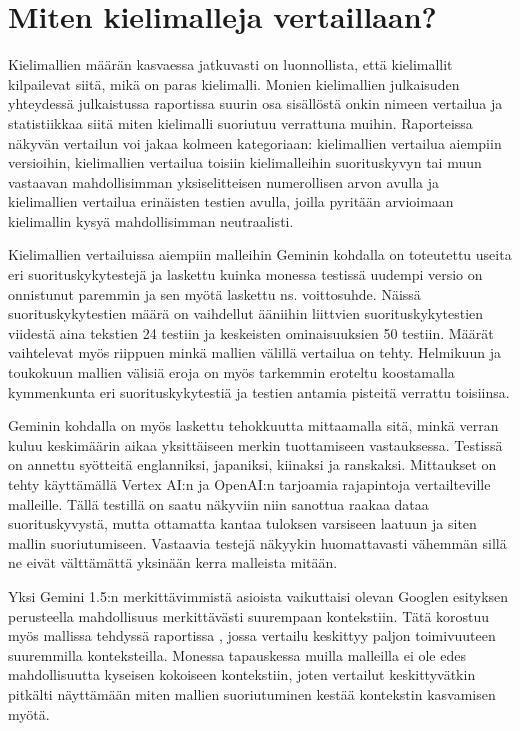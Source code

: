 \section{Miten kielimalleja vertaillaan?}

Kielimallien määrän kasvaessa jatkuvasti on luonnollista, että kielimallit
kilpailevat siitä, mikä on paras kielimalli. Monien kielimallien julkaisuden
yhteydessä julkaistussa raportissa suurin osa sisällöstä onkin nimeen vertailua
ja statistiikkaa siitä miten kielimalli suoriutuu verrattuna muihin.
Raporteissa näkyvän vertailun voi jakaa kolmeen kategoriaan: kielimallien
vertailua aiempiin versioihin, kielimallien vertailua toisiin kielimalleihin
suorituskyvyn tai muun vastaavan mahdollisimman yksiselitteisen numerollisen
arvon avulla ja kielimallien vertailua erinäisten testien avulla, joilla
pyritään arvioimaan kielimallin kysyä mahdollisimman neutraalisti.

Kielimallien vertailuissa aiempiin malleihin Geminin kohdalla on toteutettu
useita eri suorituskykytestejä ja laskettu kuinka monessa testissä uudempi
versio on onnistunut paremmin ja sen myötä laskettu ns. voittosuhde. Näissä
suorituskykytestien määrä on vaihdellut ääniihin liittvien suorituskykytestien
viidestä aina tekstien 24 testiin ja keskeisten ominaisuuksien 50 testiin.
Määrät vaihtelevat myös riippuen minkä mallien välillä vertailua on tehty.
Helmikuun ja toukokuun mallien välisiä eroja on myös tarkemmin eroteltu
koostamalla kymmenkunta eri suorituskykytestiä ja testien antamia pisteitä
verrattu toisiinsa. \parencite{googleDeepmindGeminiv1_5report}

Geminin kohdalla on myös laskettu tehokkuutta mittaamalla sitä, minkä verran
kuluu keskimäärin aikaa yksittäiseen merkin tuottamiseen vastauksessa. Testissä
on annettu syötteitä englanniksi, japaniksi, kiinaksi ja ranskaksi. Mittaukset
on tehty käyttämällä Vertex AI:n ja OpenAI:n tarjoamia rajapintoja vertailteville
malleille. \parencite{googleDeepmindGeminiv1_5report} Tällä testillä on saatu
näkyviin niin sanottua raakaa dataa suorituskyvystä, mutta ottamatta kantaa
tuloksen varsiseen laatuun ja siten mallin suoriutumiseen. Vastaavia testejä
näkyykin huomattavasti vähemmän sillä ne eivät välttämättä yksinään kerra
malleista mitään.

Yksi Gemini 1.5:n merkittävimmistä asioista vaikuttaisi olevan Googlen
esityksen \parencite{googleKeynote2024} perusteella mahdollisuus merkittävästi
suurempaan kontekstiin. Tätä korostuu myös mallissa tehdyssä raportissa
\parencite{googleDeepmindGeminiv1_5report}, jossa vertailu keskittyy paljon
toimivuuteen suuremmilla konteksteilla. Monessa tapauskessa muilla malleilla ei
ole edes mahdollisuutta kyseisen kokoiseen kontekstiin, joten vertailut
keskittyvätkin pitkälti näyttämään miten mallien suoriutuminen kestää
kontekstin kasvamisen myötä.

